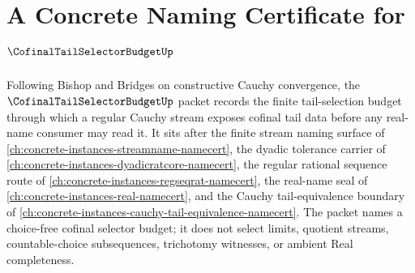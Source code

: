 \chapter{A Concrete Naming Certificate for $\CofinalTailSelectorBudgetUp$}
\label{ch:concrete-instances-cofinal-tail-selector-budget-namecert}

Following Bishop and Bridges on constructive Cauchy convergence, the $\CofinalTailSelectorBudgetUp$ packet records the finite tail-selection budget through which a regular Cauchy stream exposes cofinal tail data before any real-name consumer may read it. It sits after the finite stream naming surface of \autoref{ch:concrete-instances-streamname-namecert}, the dyadic tolerance carrier of \autoref{ch:concrete-instances-dyadicratcore-namecert}, the regular rational sequence route of \autoref{ch:concrete-instances-regseqrat-namecert}, the real-name seal of \autoref{ch:concrete-instances-real-namecert}, and the Cauchy tail-equivalence boundary of \autoref{ch:concrete-instances-cauchy-tail-equivalence-namecert}. The packet names a choice-free cofinal selector budget; it does not select limits, quotient streams, countable-choice subsequences, trichotomy witnesses, or ambient Real completeness.

